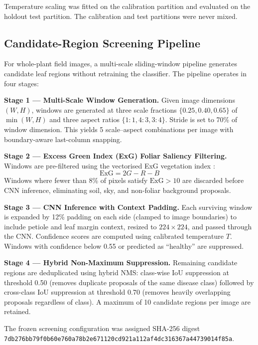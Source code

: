 \documentclass[pdflatex,sn-mathphys-num]{sn-jnl}
\theoremstyle{thmstyleone}%
\theoremstyle{thmstyletwo}%
\theoremstyle{thmstylethree}%
\begin{document}
Temperature scaling was fitted on the calibration partition and evaluated on the
holdout test partition. The calibration and test partitions were never mixed.

\subsection{Candidate-Region Screening Pipeline}
\label{sec:screening_pipeline}

For whole-plant field images, a multi-scale sliding-window pipeline generates candidate
leaf regions without retraining the classifier. The pipeline operates in four stages:

\textbf{Stage 1 — Multi-Scale Window Generation.}
Given image dimensions $(W, H)$, windows are generated at three scale fractions
$\{0.25, 0.40, 0.65\}$ of $\min(W, H)$ and three aspect ratios $\{1{:}1, 4{:}3, 3{:}4\}$.
Stride is set to 70\% of window dimension. This yields 5 scale--aspect combinations per
image with boundary-aware last-column snapping.

\textbf{Stage 2 — Excess Green Index (ExG) Foliar Saliency Filtering.}
Windows are pre-filtered using the vectorised ExG vegetation index
\citep{woebbecke1995color}:
\begin{equation}
  \text{ExG} = 2G - R - B
  \label{eq:exg}
\end{equation}
Windows where fewer than 8\% of pixels satisfy $\text{ExG} > 10$ are discarded before
CNN inference, eliminating soil, sky, and non-foliar background proposals.

\textbf{Stage 3 — CNN Inference with Context Padding.}
Each surviving window is expanded by 12\% padding on each side (clamped to image
boundaries) to include petiole and leaf margin context, resized to $224 \times 224$,
and passed through the CNN. Confidence scores are computed using calibrated temperature
$T$. Windows with confidence below 0.55 or predicted as ``healthy'' are suppressed.

\textbf{Stage 4 — Hybrid Non-Maximum Suppression.}
Remaining candidate regions are deduplicated using hybrid NMS: class-wise IoU
suppression at threshold 0.50 (removes duplicate proposals of the same disease class)
followed by cross-class IoU suppression at threshold 0.70 (removes heavily overlapping
proposals regardless of class). A maximum of 10 candidate regions per image are retained.

The frozen screening configuration was assigned SHA-256 digest
\texttt{7db276bb79f0b60e760a78b2e671120cd921a112af4dc316367a44739014f85a}.
\end{document}
